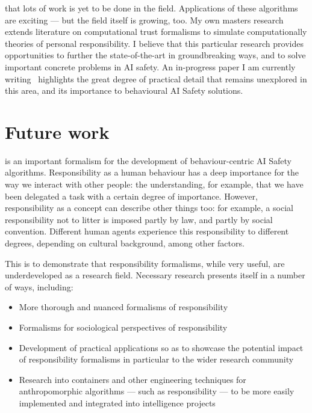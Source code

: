  that lots of work is yet to be done in the field. Applications of these algorithms are exciting --- but the field itself is growing, too. My own masters research extends literature on computational trust formalisms to simulate computationally theories of personal responsibility. I believe that this particular research provides opportunities to further the state-of-the-art in groundbreaking ways, and to solve important concrete problems in AI safety. An in-progress paper I am currently writing~\cite{wallis_2016} highlights the great degree of practical detail that remains unexplored in this area, and its importance to behavioural AI Safety solutions.\par

\section{Future work}
 is an important formalism for the development of behaviour-centric AI Safety algorithms. Responsibility as a human behaviour has a deep importance for the way we interact with other people: the understanding, for example, that we have been delegated a task with a certain degree of importance. However, responsibility as a concept can describe other things too: for example, a social responsibility not to litter is imposed partly by law, and partly by social convention. Different human agents experience this responsibility to different degrees, depending on cultural background, among other factors.\par

This is to demonstrate that responsibility formalisms, while very useful, are underdeveloped as a research field. Necessary research presents itself in a number of ways, including:

\begin{itemize}
    \item More thorough and nuanced formalisms of responsibility
    \item Formalisms for sociological perspectives of responsibility
    \item Development of practical applications so as to showcase the potential impact of responsibility formalisms in particular to the wider research community
    \item Research into containers and other engineering techniques for anthropomorphic algorithms --- such as responsibility --- to be more easily implemented and integrated into intelligence projects
\end{itemize}


